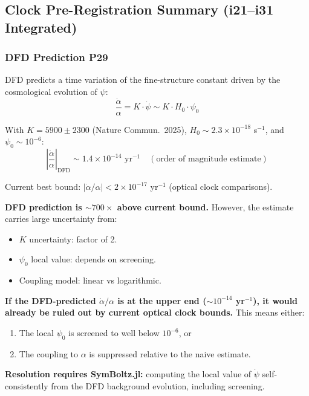 \documentclass[11pt,a4paper]{article}
\begin{document}
\subsection{Clock Pre-Registration Summary (i21--i31 Integrated)}

\subsubsection{DFD Prediction P29}

DFD predicts a time variation of the fine-structure constant driven by the cosmological evolution of $\psi$:
\begin{equation}
\frac{\dot\alpha}{\alpha} = K \cdot \dot\psi \sim K \cdot H_0 \cdot \psi_0
\end{equation}

With $K = 5900 \pm 2300$ (Nature Commun.\ 2025), $H_0 \sim 2.3 \times 10^{-18}$ s$^{-1}$, and $\psi_0 \sim 10^{-6}$:
\begin{equation}
\left|\frac{\dot\alpha}{\alpha}\right|_\mathrm{DFD} \sim 1.4 \times 10^{-14} \text{ yr}^{-1} \quad (\text{order of magnitude estimate})
\end{equation}

Current best bound: $|\dot\alpha/\alpha| < 2 \times 10^{-17}$ yr$^{-1}$ (optical clock comparisons).

\textbf{DFD prediction is $\sim 700\times$ above current bound.} However, the estimate carries large uncertainty from:
\begin{itemize}
\item $K$ uncertainty: factor of 2.
\item $\psi_0$ local value: depends on screening.
\item Coupling model: linear vs logarithmic.
\end{itemize}

\textbf{If the DFD-predicted $\dot\alpha/\alpha$ is at the upper end ($\sim 10^{-14}$ yr$^{-1}$), it would already be ruled out by current optical clock bounds.} This means either:
\begin{enumerate}
\item The local $\psi_0$ is screened to well below $10^{-6}$, or
\item The coupling to $\alpha$ is suppressed relative to the naive estimate.
\end{enumerate}

\textbf{Resolution requires SymBoltz.jl:} computing the local value of $\dot\psi$ self-consistently from the DFD background evolution, including screening.
\end{document}
